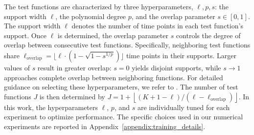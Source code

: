 \documentclass[final]{siamltex}
\begin{document}
The test functions are characterized by three hyperparameters, $\ell, p, s$: the support width $\ell$, the polynomial degree $p$, and the overlap parameter $s \in [0,1]$. The support width $\ell$ denotes the number of time points in each test 
function's support. Once $\ell$ is determined, the overlap parameter $s$ controls the degree of overlap between consecutive test functions. Specifically, neighboring test functions share $\ell_{\text{overlap}} = \lfloor \ell \cdot (1 - 
\sqrt{1 - s^{1/p}})\rfloor$
time points in their supports. Larger values of $s$ result in greater overlap: $s = 0$ yields disjoint supports, while $s \to 1$ approaches 
complete overlap between neighboring functions. For detailed guidance on selecting these hyperparameters, we refer to \cite{messenger2021weak}. The number of test functions $J$ is then determined by 
\(
J = 1 + \left\lfloor (K+1 - \ell)/(\ell - \ell_{\text{overlap}}) \right\rfloor.
\)
In this work, the hyperparameters $\ell$, $p$, and $s$ are individually tuned for each experiment to optimize performance. The specific choices used in our numerical experiments are reported in Appendix~\ref{appendix:training_details}.


\end{document}
